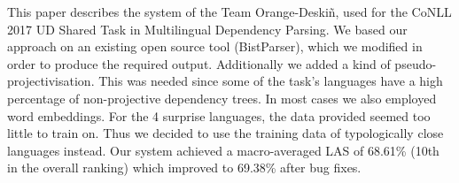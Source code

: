 This paper describes the system of the Team Orange-Deskiñ, used for the CoNLL 2017 UD Shared Task in Multilingual Dependency Parsing. We based our approach on an existing open source tool (BistParser), which we modified in order to produce the required output. Additionally we added a kind of pseudo-projectivisation. This was needed since some of the task's languages have a high percentage of non-projective dependency trees. In most cases we also employed word embeddings. For the 4 surprise languages, the data provided seemed too little to train on. Thus we decided to use the training data of typologically close languages instead. Our system achieved a macro-averaged LAS of 68.61\% (10th in the overall ranking) which improved to 69.38\% after bug fixes.

